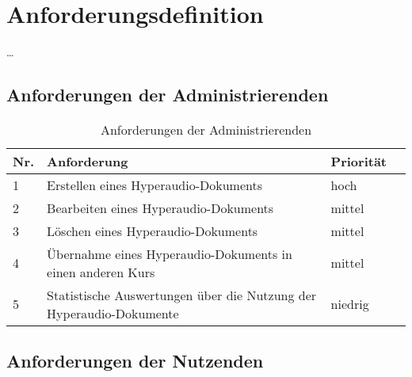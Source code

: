 \section{Anforderungsdefinition}
\label{sec:anforderungsdefinition}
\dots


\subsection{Anforderungen der Administrierenden}

\begin{table}[!ht]
\def\arraystretch{1.4}
\caption{Anforderungen der Administrierenden}
\label{tab:AnforderungenAdministrierenden}
 \begin{tabularx}{\textwidth}{lXll}      
    \hline
    Nr. & Anforderung & Priorität
    \\\hline
    1 & Erstellen eines Hyperaudio-Dokuments & hoch\\
    2 & Bearbeiten eines Hyperaudio-Dokuments & mittel\\
    3 & Löschen eines Hyperaudio-Dokuments & mittel\\
    4 & Übernahme eines Hyperaudio-Dokuments in einen anderen Kurs & mittel\\
    5 & Statistische Auswertungen über die Nutzung der Hyperaudio-Dokumente & niedrig\\
    \hline
    \end{tabularx}
\end{table}


\subsection{Anforderungen der Nutzenden}


